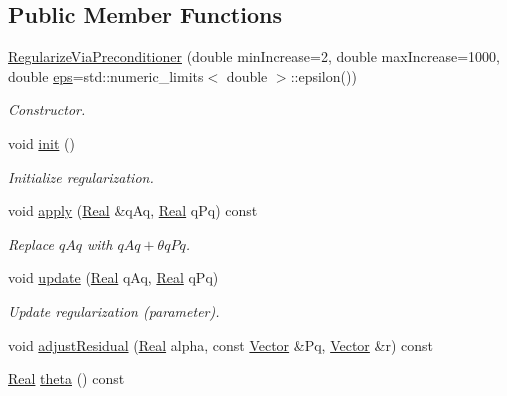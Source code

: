 \subsection*{Public Member Functions}
\begin{DoxyCompactItemize}
\item 
\hyperlink{classSpacy_1_1CG_1_1RegularizeViaPreconditioner_a1d4029bce1e151e1266bcda359b47107}{Regularize\-Via\-Preconditioner} (double min\-Increase=2, double max\-Increase=1000, double \hyperlink{classSpacy_1_1Mixin_1_1Eps_a812b99b0abc1d78a34b4114907f23f52}{eps}=std\-::numeric\-\_\-limits$<$ double $>$\-::epsilon())
\begin{DoxyCompactList}\small\item\em Constructor. \end{DoxyCompactList}\item 
\hypertarget{classSpacy_1_1CG_1_1RegularizeViaPreconditioner_a0d8a2213b04104a9fc526413b554f3d5}{void \hyperlink{classSpacy_1_1CG_1_1RegularizeViaPreconditioner_a0d8a2213b04104a9fc526413b554f3d5}{init} ()}\label{classSpacy_1_1CG_1_1RegularizeViaPreconditioner_a0d8a2213b04104a9fc526413b554f3d5}

\begin{DoxyCompactList}\small\item\em Initialize regularization. \end{DoxyCompactList}\item 
void \hyperlink{classSpacy_1_1CG_1_1RegularizeViaPreconditioner_aee1120d04c96eb2ca0a9305f3b867e19}{apply} (\hyperlink{classSpacy_1_1Real}{Real} \&q\-Aq, \hyperlink{classSpacy_1_1Real}{Real} q\-Pq) const 
\begin{DoxyCompactList}\small\item\em Replace $qAq$ with $ qAq + \theta qPq$. \end{DoxyCompactList}\item 
void \hyperlink{classSpacy_1_1CG_1_1RegularizeViaPreconditioner_afb67cec33369d62cd2389122f7e359c0}{update} (\hyperlink{classSpacy_1_1Real}{Real} q\-Aq, \hyperlink{classSpacy_1_1Real}{Real} q\-Pq)
\begin{DoxyCompactList}\small\item\em Update regularization (parameter). \end{DoxyCompactList}\item 
void \hyperlink{classSpacy_1_1CG_1_1RegularizeViaPreconditioner_ab9bb2942394aa2e30174a47b6e42207b}{adjust\-Residual} (\hyperlink{classSpacy_1_1Real}{Real} alpha, const \hyperlink{classSpacy_1_1Vector}{Vector} \&Pq, \hyperlink{classSpacy_1_1Vector}{Vector} \&r) const 
\item 
\hyperlink{classSpacy_1_1Real}{Real} \hyperlink{classSpacy_1_1CG_1_1RegularizeViaPreconditioner_ad961ac12b34d30c98ed04b9fa33649ec}{theta} () const 
\end{DoxyCompactItemize}
